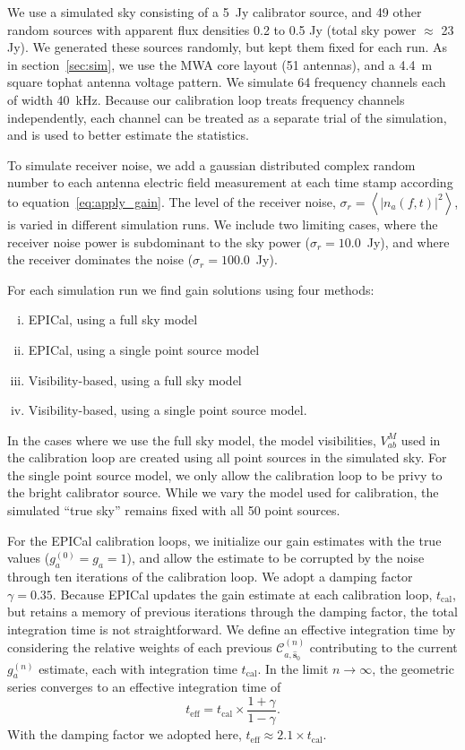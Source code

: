 \documentclass[a4paper,fleqn,usenatbib]{mnras}
\newcommand{\spix}{\ensuremath{\hat{\mathbf{s}}_{0}}}
\newcommand{\Cna}[1][n]{\ensuremath{\mathcal{C}^{(#1)}_{a,\spix}}}
\newcommand{\damp}{\ensuremath{\gamma}}
\newcommand{\tcal}{\ensuremath{t_{\mathrm{cal}}}}
\newcommand{\teff}{\ensuremath{t_{\mathrm{eff}}}}
\begin{document}
We use a simulated sky consisting of a 5~Jy calibrator source, and 49 other random sources 
with apparent flux densities 0.2 to 0.5 Jy (total sky power $\approx$ 23 Jy). We generated 
these sources randomly, but kept them fixed for each run. As in section~\ref{sec:sim}, we use 
the MWA core layout (51 antennas), and a 4.4~m square tophat antenna voltage pattern. We 
simulate 64 frequency channels each of width 40~kHz. Because our calibration loop treats 
frequency channels independently, each channel can be treated as a separate trial of the 
simulation, and is used to better estimate the statistics.

To simulate receiver noise, we add a gaussian distributed complex random number to each 
antenna electric field measurement at each time stamp according to 
equation~\ref{eq:apply_gain}. The level of the receiver noise, $\sigma_r = \left<\left|
n_a(f,t)\right|^2\right>$, is varied in different simulation runs. We include two limiting 
cases, where the receiver noise power is subdominant to the sky power ($\sigma_r = 
10.0$~Jy), and where the receiver dominates the noise ($\sigma_r=100.0$~Jy).

For each simulation run we find gain solutions using four methods:
\begin{enumerate}[i.]
\item EPICal, using a full sky model
\item EPICal, using a single point source model
\item Visibility-based, using a full sky model
\item Visibility-based, using a single point source model.
\end{enumerate}
In the cases where we use the full sky model, the model visibilities, $V^M_{ab}$ used in the 
calibration loop are created using all point sources in the simulated sky. For the single point 
source model, we only allow the calibration loop to be privy to the bright calibrator source. 
While we vary the model used for calibration, the simulated ``true sky'' remains fixed with all 50 
point sources.

For the EPICal calibration loops, we initialize our gain estimates with the true values 
(${g^{(0)}_a=g_a=1}$), and allow the estimate to be corrupted by the noise through ten 
iterations of the calibration loop. We adopt a damping factor $\damp=0.35$. Because EPICal 
updates the gain estimate at each calibration loop, \tcal, but retains a memory of previous 
iterations through the damping factor, the total integration time is not straightforward. We define 
an effective integration time by considering the relative weights of each previous $\Cna$ 
contributing to the current $g^{(n)}_a$ estimate, each with integration time \tcal. In the limit $n
\rightarrow \infty$, the geometric series converges to an effective integration time of
\begin{equation}
\teff = \tcal \times \frac{1+\damp}{1-\damp}.
\end{equation}
With the damping factor we adopted here, $\teff \approx 2.1 \times \tcal$. 
\end{document}

